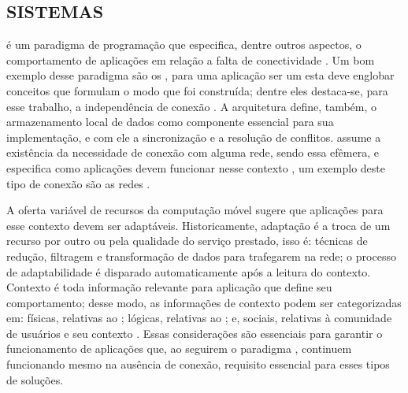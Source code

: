 \subsection{SISTEMAS }

 é um paradigma de programação que especifica, dentre outros aspectos, o comportamento de aplicações em relação a falta de conectividade \cite{OfflineFirst}. Um bom exemplo desse paradigma são os , para uma aplicação ser um  esta deve englobar conceitos que formulam o modo que foi construída; dentre eles destaca-se, para esse trabalho, a independência de conexão \cite{BjornHansen2018PWAUnifiedMobile}. A arquitetura define, também, o armazenamento local de dados como componente essencial para sua implementação, e com ele a sincronização e a resolução de conflitos.  assume a existência da necessidade de conexão com alguma rede, sendo essa efêmera, e especifica como aplicações devem funcionar nesse contexto \cite{Guda2025OfflineFirstAndroidChat}, um exemplo deste tipo de conexão são as redes .  

A oferta variável de recursos da computação móvel sugere que aplicações para esse contexto devem ser adaptáveis. Historicamente, adaptação é a troca de um recurso por outro ou pela qualidade do serviço prestado, isso é: técnicas de redução, filtragem e transformação de dados para trafegarem na rede; o processo de adaptabilidade é disparado automaticamente após a leitura do contexto. Contexto é toda informação relevante para aplicação que define seu comportamento; desse modo, as informações de contexto podem ser categorizadas em: físicas, relativas ao ; lógicas, relativas ao ; e, sociais, relativas à comunidade de usuários e seu contexto \cite{AugustinYaminGeyerBarbosa2001RequisitosAplicacoesMoveisDistribuidas}. Essas considerações são essenciais para garantir o funcionamento de aplicações que, ao seguirem o paradigma , continuem funcionando mesmo na ausência de conexão, requisito essencial para esses tipos de soluções. 
